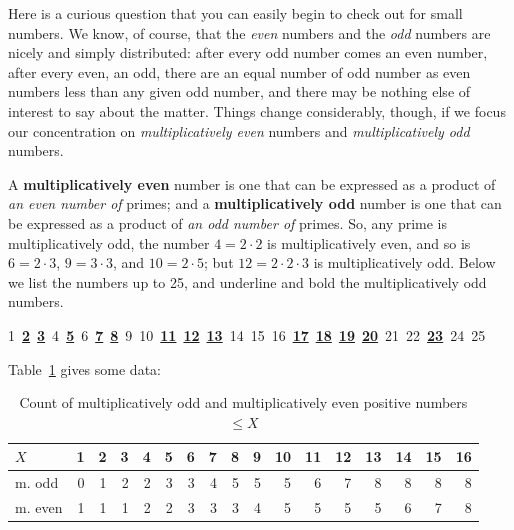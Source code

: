 \documentclass[openany]{book}
\theoremstyle{plain}
\theoremstyle{definition}
\begin{document}
Here is a curious question that you can easily begin to check out for
small numbers. We know, of course, that the {\em even} numbers and the
{\em odd} numbers are nicely and simply distributed: after every odd
number comes an even number, after every even, an odd, there are an
equal number of odd number as even numbers less than any given odd
number, and there may be nothing else of interest to say about the
matter.  Things change considerably, though, if we focus our
concentration on {\em multiplicatively even} numbers and {\em
  multiplicatively odd} numbers.


A {\bf multiplicatively even} number is one that can be expressed as a
product of {\em an even number of} primes; and a {\bf multiplicatively
  odd} number is one that can be expressed as a product of {\em an odd
  number of} primes.  So, any prime is multiplicatively odd, the
number $4 = 2\cdot 2$ is multiplicatively even, and so is $6=2\cdot
3$, $9=3\cdot 3$, and $10= 2\cdot 5$; but $12=2\cdot 2\cdot 3$ is
multiplicatively odd.   Below we list the numbers up to 25, and underline
and bold  the multiplicatively odd numbers.
\begin{center}
1\, {\bf \underline{2}}\, {\bf \underline{3}}\, 4\, {\bf
\underline{5}}\, 6\, {\bf \underline{7}}\, {\bf \underline{8}}\, 9\,
10\, {\bf \underline{11}}\, {\bf \underline{12}}\, {\bf
\underline{13}}\, 14\, 15\, 16\, {\bf \underline{17}}\, {\bf
\underline{18}}\, {\bf \underline{19}}\, {\bf \underline{20}}\, 21\,
22\, {\bf \underline{23}}\, 24\, 25
\end{center}


 Table~\ref{tab:evenodddata} gives some data:

 \begin{table}[H] \caption{Count of multiplicatively odd and
    multiplicatively even positive numbers $\le X$\label{tab:evenodddata}}
\vspace{1ex}
\centering
 {\small
\begin{tabular}{|l|r|r|r|r|r|r|r|r|r|r|r|r|r|r|r|r|}
\hline
$X$ & 1 & 2 & 3 & 4 & 5  & 6 & 7 & 8 & 9 & 10 & 11 & 12 & 13 & 14 & 15 & 16  \\ \hline\hline
m. odd & 0 & 1 & 2 & 2 & 3  & 3 & 4 & 5 & 5 & 5 & 6 & 7 & 8 & 8 & 8 & 8 \\ \hline
m. even & 1 & 1 & 1 & 2 & 2  & 3 & 3 & 3 & 4 & 5 & 5 & 5 & 5 & 6 & 7 & 8 \\ \hline
\end{tabular}}
\end{table}
\end{document}
